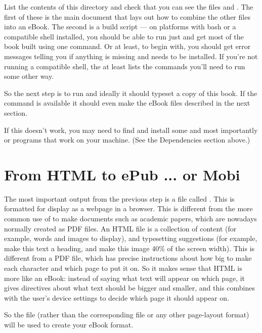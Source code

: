 List the contents of this directory and check that you can see the
files  and . The first of these
is the main \tex document that lays out how to combine the other files
into an eBook.  The second is a build script --- on platforms with
bash or a compatible shell installed, you should be able to run just
 and get most of the book built using one
command. Or at least, to begin with, you should get error messages
telling you if anything is missing and needs to be installed. If you're not
running a compatible shell, the  at least lists
the commands you'll need to run some other way.

So the next step is to run  and ideally it should
typeset a copy of this book. If the  command is
available it should even make the eBook files described in the next
section.

If this doesn't work, you may need to find and install some
 and most importantly  or
 programs that work on your machine. (See the
Dependencies section above.)

\section{From HTML to ePub ... or Mobi}
\label{sec:html2epub}

The most important output from the previous step is a file called
.  This is formatted for display as a webpage
in a browser. This is different from the more common use of \tex to
make documents such as academic papers, which are nowadays normally
created as PDF files. An HTML file is a collection of content (for
example, words and images to display), and typesetting suggestions
(for example, make this text a heading, and make this image 40\% of
the screen width). This is different from a PDF file, which has
precise instructions about how big to make each character and which
page to put it on. So it makes sense that HTML is more like an eBook:
instead of saying what text will appear on which page, it gives
directives about what text should be bigger and smaller, and this
combines with the user's device settings to decide which page it
should appear on.

So the  file (rather than the corresponding
 file or any other page-layout format) will be used to
create your eBook format. 

